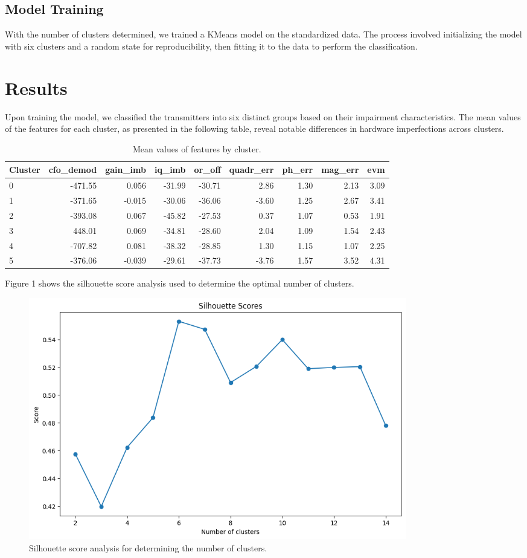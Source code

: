 \documentclass{article}
\begin{document}
\subsection{Model Training}
With the number of clusters determined, we trained a KMeans model on the standardized data. The process involved initializing the model with six clusters and a random state for reproducibility, then fitting it to the data to perform the classification.

\section{Results}
Upon training the model, we classified the transmitters into six distinct groups based on their impairment characteristics. The mean values of the features for each cluster, as presented in the following table, reveal notable differences in hardware imperfections across clusters.

\begin{table}
\centering
\label{tab:cluster_stats}
\begin{tabular}{lrrrrrrrr}
\toprule
Cluster & cfo\_demod & gain\_imb & iq\_imb & or\_off & quadr\_err & ph\_err & mag\_err & evm \\
\midrule
0 & -471.55 & 0.056 & -31.99 & -30.71 & 2.86 & 1.30 & 2.13 & 3.09 \\
1 & -371.65 & -0.015 & -30.06 & -36.06 & -3.60 & 1.25 & 2.67 & 3.41 \\
2 & -393.08 & 0.067 & -45.82 & -27.53 & 0.37 & 1.07 & 0.53 & 1.91 \\
3 & 448.01 & 0.069 & -34.81 & -28.60 & 2.04 & 1.09 & 1.54 & 2.43 \\
4 & -707.82 & 0.081 & -38.32 & -28.85 & 1.30 & 1.15 & 1.07 & 2.25 \\
5 & -376.06 & -0.039 & -29.61 & -37.73 & -3.76 & 1.57 & 3.52 & 4.31 \\
\bottomrule
\end{tabular}
\caption{Mean values of features by cluster.}
\end{table}



Figure 1 shows the silhouette score analysis used to determine the optimal number of clusters.

\begin{figure}[ht]
\centering
\includegraphics[width=0.8\textwidth]{silhouette.png}
\caption{Silhouette score analysis for determining the number of clusters.}
\label{fig:silhouette}
\end{figure}
\end{document}
